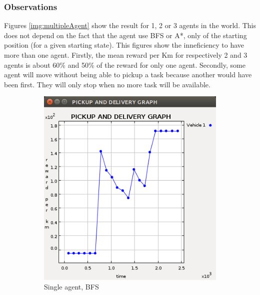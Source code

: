 \documentclass[11pt]{article}
\begin{document}
\subsubsection{Observations}
Figures \ref{img:multipleAgent} show the result for 1, 2 or 3 agents in the world. This does not depend on the fact that the agent use BFS or A*, only of the starting position (for a given starting state).
This figures show the inneficiency to have more than one agent. Firstly, the mean reward per Km for respectively 2 and 3 agents is about 60\% and 50\% of the reward for only one agent. Secondly, some agent will move without being able to pickup a task because another would have been first. They will only stop when no more task will be available.
\begin{figure}
  \begin{subfigure}[b]{0.3\textwidth}
    \includegraphics[width=\textwidth]{1agent.png}
    \caption{Single agent, BFS}
    \label{img:1agent}
  \end{subfigure}
  \begin{subfigure}[b]{0.3\textwidth}

\end{subfigure}
\end{figure}
\end{document}
